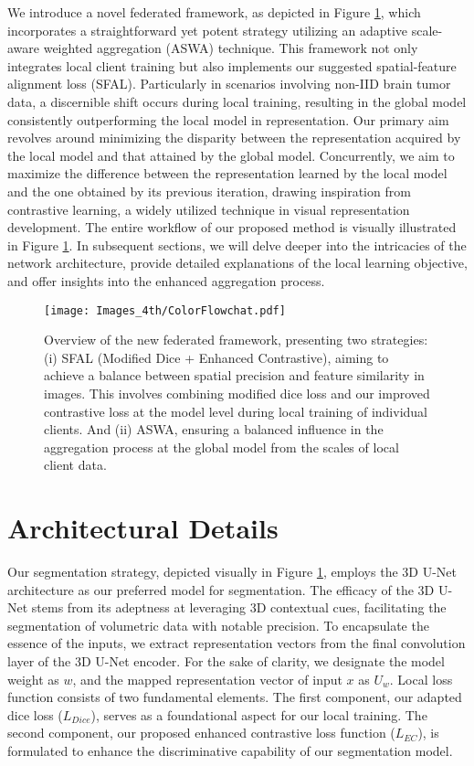 We introduce a novel federated framework, as depicted in Figure \ref{Fig: fe4dFramework}, which incorporates a straightforward yet potent strategy utilizing an adaptive scale-aware weighted aggregation (ASWA) technique. This framework not only integrates local client training but also implements our suggested spatial-feature alignment loss (SFAL). Particularly in scenarios involving non-IID brain tumor data, a discernible shift occurs during local training, resulting in the global model consistently outperforming the local model in representation. Our primary aim revolves around minimizing the disparity between the representation acquired by the local model and that attained by the global model. Concurrently, we aim to maximize the difference between the representation learned by the local model and the one obtained by its previous iteration, drawing inspiration from contrastive learning, a widely utilized technique in visual representation development. The entire workflow of our proposed method is visually illustrated in Figure \ref{Fig: fe4dFramework}. In subsequent sections, we will delve deeper into the intricacies of the network architecture, provide detailed explanations of the local learning objective, and offer insights into the enhanced aggregation process.

\begin{figure}[!h]
  \centering
   \texttt{[image: Images\_4th/ColorFlowchat.pdf]}
    \caption{Overview of the new federated framework, presenting two strategies: (i) SFAL (Modified Dice + Enhanced Contrastive), aiming to achieve a balance between spatial precision and feature similarity in images. This involves combining modified dice loss and our improved contrastive loss at the model level during local training of individual clients. And (ii) ASWA, ensuring a balanced influence in the aggregation process at the global model from the scales of local client data.}
  \label{Fig: fe4dFramework}
\end{figure}

\section{Architectural Details}
Our segmentation strategy, depicted visually in Figure \ref{Fig: fe4dFramework}, employs the 3D U-Net architecture \cite{cai2022novel,11} as our preferred model for segmentation. The efficacy of the 3D U-Net stems from its adeptness at leveraging 3D contextual cues, facilitating the segmentation of volumetric data with notable precision. To encapsulate the essence of the inputs, we extract representation vectors from the final convolution layer of the 3D U-Net encoder. For the sake of clarity, we designate the model weight as $w$, and the mapped representation vector of input $x$ as $U_w$. Local loss function consists of two fundamental elements. The first component, our adapted dice loss ($L_{Dice}$), serves as a foundational aspect for our local training. The second component, our proposed enhanced contrastive loss function ($L_{EC}$), is formulated to enhance the discriminative capability of our segmentation model.

